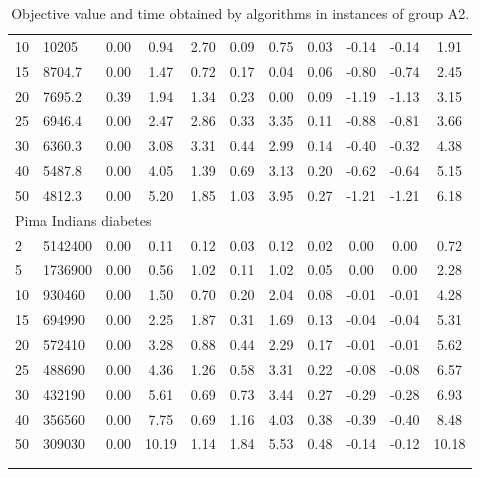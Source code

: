 {\begin{longtable}{@{}llccccccccc@{}}
10 & 10205      & 0.00         & 0.94         & 2.70        & 0.09       & 0.75        & 0.03      & -0.14     & -0.14     & 1.91  \\
15 & 8704.7     & 0.00         & 1.47         & 0.72        & 0.17       & 0.04        & 0.06      & -0.80     & -0.74     & 2.45  \\
20 & 7695.2     & 0.39         & 1.94         & 1.34        & 0.23       & 0.00        & 0.09      & -1.19     & -1.13     & 3.15  \\
25 & 6946.4     & 0.00         & 2.47         & 2.86        & 0.33       & 3.35        & 0.11      & -0.88     & -0.81     & 3.66  \\
30 & 6360.3     & 0.00         & 3.08         & 3.31        & 0.44       & 2.99        & 0.14      & -0.40     & -0.32     & 4.38  \\
40 & 5487.8     & 0.00         & 4.05         & 1.39        & 0.69       & 3.13        & 0.20      & -0.62     & -0.64     & 5.15  \\
50 & 4812.3     & 0.00         & 5.20         & 1.85        & 1.03       & 3.95        & 0.27      & -1.21     & -1.21     & 6.18  \\
\multicolumn{11}{l}{Pima Indians diabetes}                                                                                         \\
2  & 5142400    & 0.00         & 0.11         & 0.12        & 0.03       & 0.12        & 0.02      & 0.00      & 0.00      & 0.72  \\
5  & 1736900    & 0.00         & 0.56         & 1.02        & 0.11       & 1.02        & 0.05      & 0.00      & 0.00      & 2.28  \\
10 & 930460     & 0.00         & 1.50         & 0.70        & 0.20       & 2.04        & 0.08      & -0.01     & -0.01     & 4.28  \\
15 & 694990     & 0.00         & 2.25         & 1.87        & 0.31       & 1.69        & 0.13      & -0.04     & -0.04     & 5.31  \\
20 & 572410     & 0.00         & 3.28         & 0.88        & 0.44       & 2.29        & 0.17      & -0.01     & -0.01     & 5.62  \\
25 & 488690     & 0.00         & 4.36         & 1.26        & 0.58       & 3.31        & 0.22      & -0.08     & -0.08     & 6.57  \\
30 & 432190     & 0.00         & 5.61         & 0.69        & 0.73       & 3.44        & 0.27      & -0.29     & -0.28     & 6.93  \\
40 & 356560     & 0.00         & 7.75         & 0.69        & 1.16       & 4.03        & 0.38      & -0.39     & -0.40     & 8.48  \\
50 & 309030     & 0.00         & 10.19        & 1.14        & 1.84       & 5.53        & 0.48      & -0.14     & -0.12     & 10.18 \\ \bottomrule
\caption{Objective value and time obtained by algorithms in instances of group A2.}\\
\label{results-all-A2}\\
\end{longtable}}
